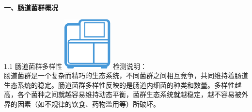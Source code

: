 

\usepackage{graphicx}
\graphicspath{{cores/}}



\vspace*{5mm}
\setlength{\arrayrulewidth}{1pt}
\fontsize{9.03pt}{14pt}\selectfont
\color{gray2}

{\noindent\bf\biaotia 一、肠道菌群概况}

\vspace*{4mm}

\begin{LRaside}[.8]{1.1 肠道菌群多样性}
\noindent
\includegraphics[scale=1]{diversity.pdf}
\asidebreak %
检测说明：\\
肠道菌群是一个复杂而精巧的生态系统，不同菌群之间相互竞争，共同维持着肠道生态系统的稳定。肠道菌群多样性反映的是肠道内细菌的种类和数量。多样性越高，各个菌种之间就越容易维持动态平衡，菌群生态系统就越稳定，越不容易被外界的因素（如不规律的饮食、药物滥用等）所破坏。
\end{LRaside}

